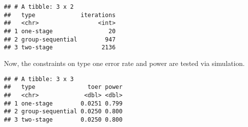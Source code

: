 \documentclass[
]{book}
\newenvironment{Shaded}{\begin{snugshade}}{\end{snugshade}}
\newcommand{\DataTypeTok}[1]{\textcolor[rgb]{0.13,0.29,0.53}{#1}}
\newcommand{\DecValTok}[1]{\textcolor[rgb]{0.00,0.00,0.81}{#1}}
\newcommand{\FloatTok}[1]{\textcolor[rgb]{0.00,0.00,0.81}{#1}}
\newcommand{\KeywordTok}[1]{\textcolor[rgb]{0.13,0.29,0.53}{\textbf{#1}}}
\newcommand{\NormalTok}[1]{#1}
\newcommand{\OperatorTok}[1]{\textcolor[rgb]{0.81,0.36,0.00}{\textbf{#1}}}
\newcommand{\StringTok}[1]{\textcolor[rgb]{0.31,0.60,0.02}{#1}}
\begin{document}
\begin{verbatim}
## # A tibble: 3 x 2
##   type             iterations
##   <chr>                 <int>
## 1 one-stage                20
## 2 group-sequential        947
## 3 two-stage              2136
\end{verbatim}

Now, the constraints on type one error rate and power are tested via simulation.

\begin{Shaded}
\end{Shaded}

\begin{verbatim}
## # A tibble: 3 x 3
##   type               toer power
##   <chr>             <dbl> <dbl>
## 1 one-stage        0.0251 0.799
## 2 group-sequential 0.0250 0.800
## 3 two-stage        0.0250 0.800
\end{verbatim}
\end{document}
